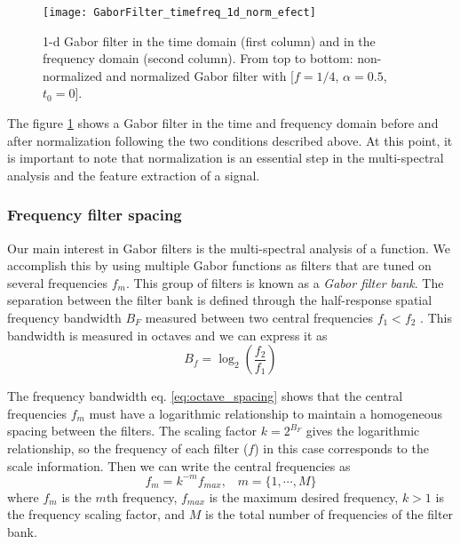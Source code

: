 \begin{figure}[!ht]
	\centering
	\texttt{[image: GaborFilter\_timefreq\_1d\_norm\_efect]}
	\caption{1-d Gabor filter in the time domain (first column) and in the frequency domain (second  column). From top to bottom: non-normalized and normalized Gabor filter with [$f =1/4$, $\alpha=0.5$, $t_0=0$].}\label{fig:GaborFilter_timefreq_norm_efect}
\end{figure}

The figure \ref{fig:GaborFilter_timefreq_norm_efect} shows a Gabor filter in the time and frequency domain before and after normalization following the two conditions described above. At this point, it is important to note that normalization is an essential step in the multi-spectral analysis and the feature extraction of a signal.

\subsubsection{Frequency filter spacing}\label{subsec:frequency_filter_spacing}
Our main interest in Gabor filters is the multi-spectral analysis of a function. We accomplish this by using multiple Gabor functions as filters that are tuned on several frequencies $f_m$. This group of filters is known as a \textit{Gabor filter bank}. The separation between the filter bank is defined through the half-response spatial frequency bandwidth $B_F$ measured between two central frequencies $f_1 < f_2$ \citep{Granlund:CGIP:1978}. This bandwidth is measured in octaves and we can express it as
\begin{equation}\label{eq:octave_spacing}
    B_f = \log_2 \left( \frac{f_2}{f_1} \right)
\end{equation}

The frequency bandwidth eq. \eqref{eq:octave_spacing} shows that the central frequencies $f_m$ must have a logarithmic relationship to maintain a homogeneous spacing between the filters. The scaling factor $k=2^{B_F}$ gives the logarithmic relationship, so the frequency of each filter ($f$) in this case corresponds to the scale information. Then we can write the central frequencies as
\begin{equation}
	f_m = k^{-m} f_{max}\textrm{,} \quad m = \{1, \cdots, M\} \label{eq:filterbank_frequencies}
\end{equation} 
where $f_m$ is the $m$th frequency, $f_{max}$ is the maximum desired frequency, $k>1$ is the frequency scaling factor, and $M$ is the total number of frequencies of the filter bank.

